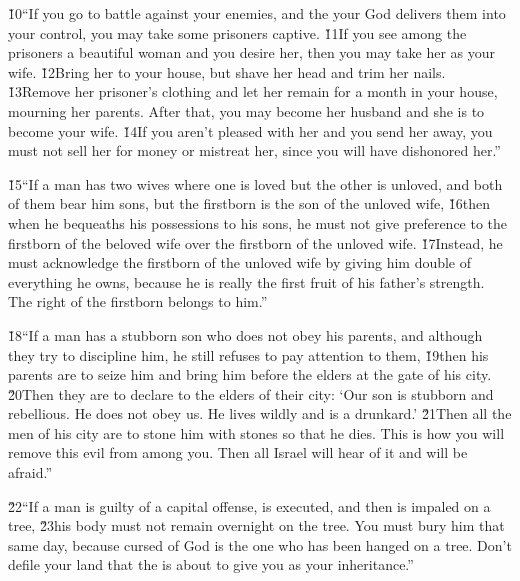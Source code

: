 \v{10}``If you go to battle against your enemies, and the  your God delivers them into your control, you may take some prisoners captive. \v{11}If you see among the prisoners a beautiful woman and you desire her, then you may take her as your wife. \v{12}Bring her to your house, but shave her head and trim her nails. \v{13}Remove her prisoner's clothing and let her remain for a month in your house, mourning her parents. After that, you may become her husband and she is to become your wife. \v{14}If you aren't pleased with her and you send her away, you must not sell her for money or mistreat her, since you will have dishonored her.''

\v{15}``If a man has two wives where one is loved but the other is unloved, and both of them bear him sons, but the firstborn is the son of the unloved wife, \v{16}then when he bequeaths his possessions to his sons, he must not give preference to the firstborn of the beloved wife over the firstborn of the unloved wife. \v{17}Instead, he must acknowledge the firstborn of the unloved wife by giving him double of everything he owns, because he is really the first fruit of his father's strength. The right of the firstborn belongs to him.''

\v{18}``If a man has a stubborn son who does not obey his parents, and although they try to discipline him, he still refuses to pay attention to them, \v{19}then his parents are to seize him and bring him before the elders at the gate of his city. \v{20}Then they are to declare to the elders of their city: `Our son is stubborn and rebellious. He does not obey us. He lives wildly and is a drunkard.' \v{21}Then all the men of his city are to stone him with stones so that he dies. This is how you will remove this evil from among you. Then all Israel will hear of it and will be afraid.''

\v{22}``If a man is guilty of a capital offense, is executed, and then is impaled on a tree, \v{23}his body must not remain overnight on the tree. You must bury him that same day, because cursed of God is the one who has been hanged on a tree. Don't defile your land that the  is about to give you as your inheritance.''


